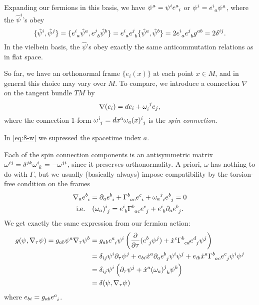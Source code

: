 Expanding our fermions in this basis, we have $\psi^{a} = \psi^{i} e\indices{^{a}_{i}}$ or $\psi^{i} = e\indices{^{i}_{a}} \psi^{a}$, where the $\hat{\psi}^{i}$'s obey 
\begin{equation}
  \{\hat{\psi}^{i}, \hat{\psi}^{j}\} = \{e\indices{^{i}_{a}} \hat{\psi}^{a} , e\indices{^{j}_{b}} \hat{\psi}^{b}\} = e\indices{^{i}_{a}} e\indices{^{j}_{b}} \{\hat{\psi}^{a}, \hat{\psi}^{b}\} = 2 e\indices{^{i}_{a}} e\indices{^{j}_{b}} g^{ab} = 2 \delta^{ij}.
\end{equation}
In the vielbein basis, the $\hat{\psi}$'s obey exactly the same anticommutation relations as in flat space.

So far, we have an orthonormal frame $\{e_i (x)\}$ at each point $x \in M$, and in general this choice may vary over $M$.
To compare, we introduce a connection $\nabla$ on the tangent bundle $T M$ by 
\begin{equation}
  \label{eq:8-w}
  \nabla (e_{i}) = d e_i + \omega\indices{_{i}^{j}} e_{j},
\end{equation}
where the connection 1-form $\omega\indices{^{i}_{j}} = dx^{a} \omega_{a}(x)\indices{^{i}_{j}}$ is the \emph{spin connection}.
\begin{remark}
  In \eqref{eq:8-w} we supressed the spacetime index $a$.
\end{remark}
Each of the spin connection components is an antisymmetric matrix $\omega^{ij} = \delta^{jk} \omega\indices{^{i}_{k}} = - \omega^{ji}$, since it preserves orthonormality.
A priori, $\omega$ has nothing to do with $\Gamma$, but we usually (basically always) impose compatibility by the torsion-free condition on the frames
\begin{gather}
  \nabla_a e\indices{^{b}_{i}} = \partial_{a} e\indices{^{b}_{i}} + \Gamma\indices{^{b}_{ac}} e\indices{^{c}_{i}} + \omega_{a}{}\indices{^{j}_{i}} e\indices{^{b}_{j}} = 0 \\
  \text{i.e.} \quad (\omega_a)\indices{^{i}_{j}} = e\indices{^{i}_{b}} \Gamma\indices{^{b}_{ac}} e\indices{^{c}_{j}} + e\indices{^{i}_{b}} \partial_{a} e\indices{^{b}_{j}} \label{eq:9-omega}.
\end{gather}
We get exactly the same expression from our fermion action:
\begin{align}
  g (\psi, \nabla_\tau \psi) = g_{ab} \psi^{a} \nabla_\tau \psi^{b} &= g_{ab} e\indices{^{a}_{i}} \psi^{i} \left( \frac{\partial }{\partial \tau} (e\indices{^{b}_{j}} \psi^{j}) + \dot{x}^{c} \Gamma\indices{^{b}_{cd}} e\indices{^{d}_{j}} \psi^{j} \right) \\
				       &= \delta_{ij} \psi^{i} \partial_{\tau} \psi^{j} + e_{bi} \dot{x}^{a} \partial_{a} e\indices{^{b}_{j}} \psi^{i} \psi^{j} + e_{ib} \dot{x}^{a} \Gamma\indices{^{b}_{ac}} e\indices{^{c}_{j}} \psi^{i} \psi^{j} \\
				       &= \delta_{ij} \psi^{i} \left( \partial_{\tau} \psi^{j} + \dot{x}^{a} (\omega_a)\indices{^{j}_{k}} \psi^{k} \right) \\
				       &= \delta(\psi, \nabla_\tau \psi)
\end{align}
where $e_{bi} = g_{ab} e\indices{^{a}_{i}}$.
